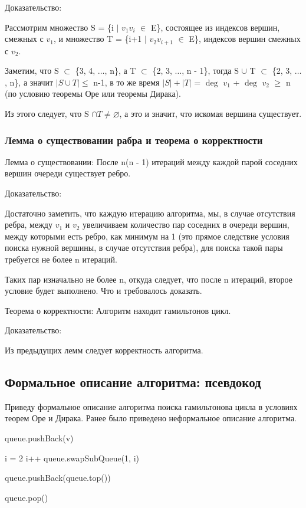 {Доказательство:}

Рассмотрим множество S = \{i $\mid$ $v_1$$v_i$ $\in$ E\}, состоящее из индексов вершин, смежных с $v_1$, и множество T = \{i+1 $\mid$ $v_2$$v_{i+1}$ $\in$ E\}, индексов вершин смежных с $v_2$.

Заметим, что S $\subset$ \{3, 4, $\ldots$, n\}, а T $\subset$ \{2, 3, $\ldots$, n - 1\}, тогда S $\cup$ T $\subset$ \{2, 3, $\ldots$, n\},
а значит $\left\vert S \cup T \right\vert \leqslant$ n-1, в то же время $\left\vert S \right\vert + \left\vert T \right\vert$ = $\operatorname{deg}$ $v_1$ + $\operatorname{deg}$ $v_2$ $\geqslant$ n (по условию теоремы Оре или теоремы Дирака).

Из этого следует, что S $\cap T \ne \varnothing$, а это и значит, что искомая вершина существует.

\subsubsection{Лемма о существовании рабра и теорема о корректности}
{Лемма о существовании:}
После n(n - 1) итераций между каждой парой соседних вершин очереди существует ребро.

{Доказательство:}

Достаточно заметить, что каждую итерацию алгоритма, мы, в случае отсутствия ребра, между $v_1$ и $v_2$ увеличиваем количество пар соседних в очереди вершин, между которыми есть ребро,
как минимум на 1 (это прямое следствие условия поиска нужной вершины, в случае отсутствия ребра), для поиска такой пары требуется не более n итераций.

Таких пар изначально не более n, откуда следует, что после n итераций, второе условие будет выполнено.
Что и требовалось доказать.

{Теорема о корректности:}
Алгоритм находит гамильтонов цикл.

{Доказательство:}

Из предыдущих лемм следует корректность алгоритма.

\subsection{Формальное описание алгоритма: псевдокод}
Приведу формальное описание алгоритма поиска гамильтонова цикла в условиях теорем Оре и Дирака.
Ранее было приведено неформальное описание алгоритма.

\begin{algorithmic}[1]

\State queue.pushBack(v)
\EndFor


    \State i = 2
    \State  {}
            \State i++
            \EndWhile
    \State queue.swapSubQueue(1, i)
\EndIf

queue.pushBack(queue.top())

queue.pop()
\EndFor
\EndProcedure
\end{algorithmic}

